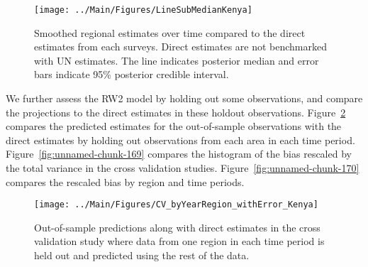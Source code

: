 \documentclass[12pt]{article}\usepackage[]{graphicx}\usepackage[]{color}
\newenvironment{knitrout}{}{} %
\begin{document}
\begin{knitrout}
\color{fgcolor}\begin{figure}[bht]

{\centering \texttt{[image: ../Main/Figures/LineSubMedianKenya]} 

}

\caption[Smoothed regional estimates over time compared to the direct estimates from each surveys]{Smoothed regional estimates over time compared to the direct estimates from each surveys. Direct estimates are not benchmarked with UN estimates. The line indicates posterior median and error bars indicate 95\% posterior credible interval.}\label{fig:unnamed-chunk-167}
\end{figure}


\end{knitrout}
We further assess the RW2 model by holding out some observations, and compare the projections to the direct estimates in these holdout observations. Figure~\ref{fig:unnamed-chunk-168} compares the predicted estimates for the out-of-sample observations  with the direct estimates by holding out observations from each area in each time period.  Figure~\ref{fig:unnamed-chunk-169} compares the histogram of the bias rescaled by the total variance in the cross validation studies. Figure~\ref{fig:unnamed-chunk-170} compares the rescaled bias by region and time periods.



 
\begin{knitrout}
\color{fgcolor}\begin{figure}[bht]

{\centering \texttt{[image: ../Main/Figures/CV\_byYearRegion\_withError\_Kenya]} 

}

\caption[Out-of-sample predictions along with direct estimates in the cross validation study where data from one region in each time period is held out and predicted using the rest of the data]{Out-of-sample predictions along with direct estimates in the cross validation study where data from one region in each time period is held out and predicted using the rest of the data.}\label{fig:unnamed-chunk-168}
\end{figure}


\end{knitrout}
\end{document}
